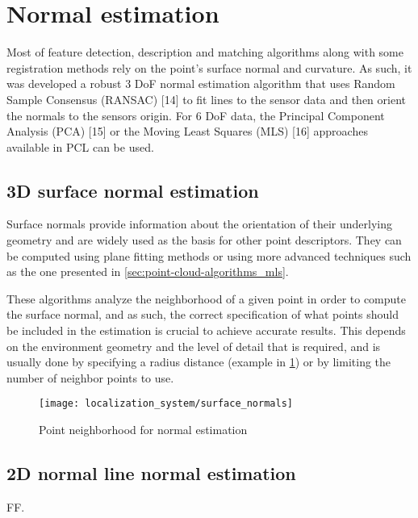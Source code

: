 \section{Normal estimation}

Most of feature detection, description and matching algorithms along with some registration methods rely on the point’s surface normal and curvature. As such, it was developed a robust 3 DoF normal estimation algorithm that uses Random Sample Consensus (RANSAC) [14] to fit lines to the sensor data and then orient the normals to the sensors origin. For 6 DoF data, the Principal Component Analysis (PCA) [15] or the Moving Least Squares (MLS) [16] approaches available in PCL can be used.


\subsection{3D surface normal estimation}

Surface normals provide information about the orientation of their underlying geometry and are widely used as the basis for other point descriptors. They can be computed using plane fitting methods or using more advanced techniques such as the one presented in \cref{sec:point-cloud-algorithms_mls}.

These algorithms analyze the neighborhood of a given point in order to compute the surface normal, and as such, the correct specification of what points should be included in the estimation is crucial to achieve accurate results. This depends on the environment geometry and the level of detail that is required, and is usually done by specifying a radius distance (example in \cref{fig:point-cloud-algorithms_surface-normals}) or by limiting the number of neighbor points to use.

\begin{figure}[H]
	\centering
	\texttt{[image: localization\_system/surface\_normals]}
	\caption[Point neighborhood for normal estimation]{Point neighborhood for normal estimation \cite{Rusu2010a}}
	\label{fig:point-cloud-algorithms_surface-normals}
\end{figure}


\subsection{2D normal line normal estimation}

FF.



